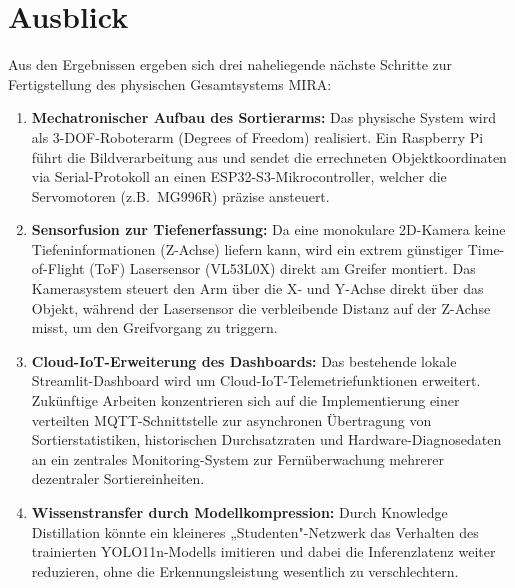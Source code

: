 \section{Ausblick}

Aus den Ergebnissen ergeben sich drei naheliegende nächste Schritte zur Fertigstellung des physischen Gesamtsystems MIRA:

\begin{enumerate}
    \item \textbf{Mechatronischer Aufbau des Sortierarms:} Das physische System wird als 3-DOF-Roboterarm (Degrees of Freedom) realisiert. Ein Raspberry Pi führt die Bildverarbeitung aus und sendet die errechneten Objektkoordinaten via Serial-Protokoll an einen ESP32-S3-Mikrocontroller, welcher die Servomotoren (z.B.\ MG996R) präzise ansteuert.
    \item \textbf{Sensorfusion zur Tiefenerfassung:} Da eine monokulare 2D-Kamera keine Tiefeninformationen (Z-Achse) liefern kann, wird ein extrem günstiger Time-of-Flight (ToF) Lasersensor (VL53L0X) direkt am Greifer montiert. Das Kamerasystem steuert den Arm über die X- und Y-Achse direkt über das Objekt, während der Lasersensor die verbleibende Distanz auf der Z-Achse misst, um den Greifvorgang zu triggern.
    \item \textbf{Cloud-IoT-Erweiterung des Dashboards:} Das bestehende lokale Streamlit-Dashboard wird um Cloud-IoT-Telemetriefunktionen erweitert. Zukünftige Arbeiten konzentrieren sich auf die Implementierung einer verteilten MQTT-Schnittstelle zur asynchronen Übertragung von Sortierstatistiken, historischen Durchsatzraten und Hardware-Diagnosedaten an ein zentrales Monitoring-System zur Fernüberwachung mehrerer dezentraler Sortiereinheiten.
    \item \textbf{Wissenstransfer durch Modellkompression:} Durch Knowledge Distillation \cite{hinton2015distilling} könnte ein kleineres „Studenten"-Netzwerk das Verhalten des trainierten YOLO11n-Modells imitieren und dabei die Inferenzlatenz weiter reduzieren, ohne die Erkennungsleistung wesentlich zu verschlechtern.
\end{enumerate}